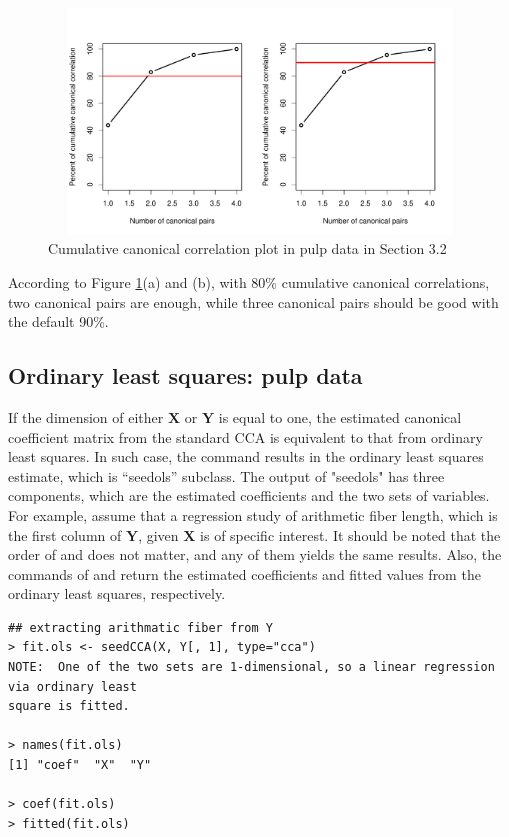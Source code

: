 \begin{figure}
\begin{center}
\includegraphics[width=12cm,height=6cm]{pulp_cor.pdf}
\vspace{-5mm}
\caption{Cumulative canonical correlation plot in pulp data in Section 3.2}
\label{cca}
\end{center}
\end{figure}
%
According to Figure \ref{cca}(a) and (b), with 80\% cumulative canonical correlations,
two canonical pairs are enough,
while three canonical pairs should be good with the default 90\%.

\subsection{Ordinary least squares: pulp data}
If the dimension of either $\mathbf{X}$ or $\mathbf{Y}$ is equal to one,
the estimated canonical coefficient matrix from the standard CCA
is equivalent to that from ordinary least squares.
In such case,  the command   results in
the ordinary least squares estimate, which is ``seedols'' subclass.
The output of "seedols" has three components, which are  the estimated coefficients 
and the two sets of variables.
For example, assume that a regression study of arithmetic fiber length,
which is the first column of $\mathbf{Y}$, given $\mathbf{X}$ is of specific interest.
It should be noted that the order of 
and   does not matter,
and any of them yields the same results.
Also, the commands of  and  return
the estimated coefficients and fitted values from the ordinary least squares, respectively.
%
\begin{verbatim}
## extracting arithmatic fiber from Y
> fit.ols <- seedCCA(X, Y[, 1], type="cca")
NOTE:  One of the two sets are 1-dimensional, so a linear regression via ordinary least
square is fitted.

> names(fit.ols)
[1] "coef"  "X"  "Y"

> coef(fit.ols)
> fitted(fit.ols)
\end{verbatim}
%

